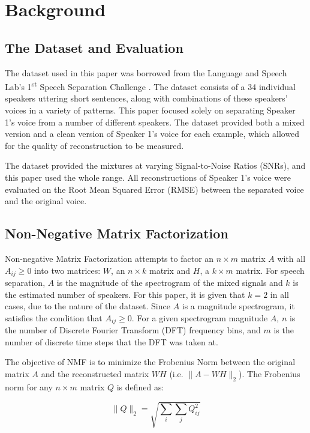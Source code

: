 \documentclass[12pt,chapterheads]{ucsd}
\begin{document}
\section{Background}
\subsection{The Dataset and Evaluation}
The dataset used in this paper was borrowed from the Language and Speech Lab's 1\textsuperscript{st} Speech Separation Challenge \cite{laslab}. The dataset consists of a 34 individual speakers uttering short sentences, along with combinations of these speakers' voices in a variety of patterns. This paper focused solely on separating Speaker 1's voice from a number of different  speakers. The dataset provided both a mixed version and a clean version of Speaker 1's voice for each example, which allowed for the quality of reconstruction to be measured. 

The dataset provided the mixtures at varying Signal-to-Noise Ratios (SNRs), and this paper used the whole range. All reconstructions of Speaker 1's voice were evaluated on the Root Mean Squared Error (RMSE) between the separated voice and the original voice.

\subsection{Non-Negative Matrix Factorization}
Non-negative Matrix Factorization attempts to factor an $n \times m$ matrix $A$ with all $A_{ij} \geq 0$ into two matrices: $W$, an $n \times k$ matrix and $H$, a $k \times m$ matrix. For speech separation, $A$ is the magnitude of the spectrogram of the mixed signals and $k$ is the estimated number of speakers. For this paper, it is given that $k=2$ in all cases, due to the nature of the dataset. Since $A$ is a magnitude spectrogram, it satisfies the condition that $A_{ij} \geq 0$. For a given spectrogram magnitude $A$, $n$ is the number of Discrete Fourier Transform (DFT) frequency bins, and $m$ is the number of discrete time steps that the DFT was taken at.

The objective of NMF is to minimize the Frobenius Norm between the original matrix $A$ and the reconstructed matrix $WH$ (i.e. $\| A - WH\|_2$). The Frobenius norm for any $n \times m$ matrix $Q$ is defined as:

\begin{equation}
\| Q \|_2 = \sqrt{\sum\limits_{i} \sum\limits_{j} Q_{ij}^2}
\end{equation}
\end{document}
